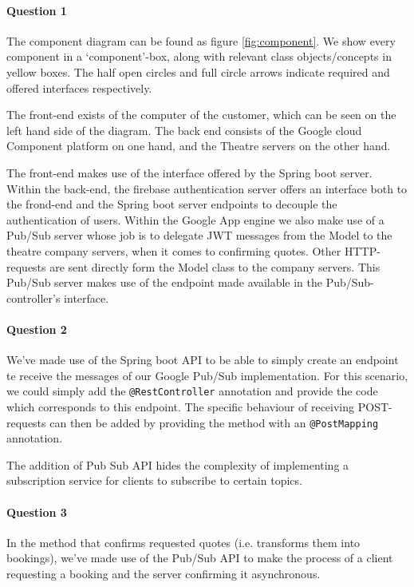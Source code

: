 \documentclass{ds-report}
\begin{document}
	\maketitle

	\paragraph{Question 1}
	The component diagram can be found as figure \ref{fig:component}. We show every component in a `component'-box, along with relevant class objects/concepts in yellow boxes. The half open circles and full circle arrows indicate required and offered interfaces respectively.
	
	The front-end exists of the computer of the customer, which can be seen on the left hand side of the diagram. The back end consists of the Google cloud Component platform on one hand, and the Theatre servers on the other hand.
	
	The front-end makes use of the interface offered by the Spring boot server. Within the back-end, the firebase authentication server offers an interface both to the frond-end and the Spring boot server endpoints to decouple the authentication of users. Within the Google App engine we also make use of a Pub/Sub server whose job is to delegate JWT messages from the Model to the theatre company servers, when it comes to confirming quotes. Other HTTP-requests are sent directly form the Model class to the company servers. This Pub/Sub server makes use of the endpoint made available in the Pub/Sub-controller's interface.
	\paragraph{Question 2} 
	We've made use of the Spring boot API to be able to simply create an endpoint te receive the messages of our Google Pub/Sub implementation. For this scenario, we could simply add the \texttt{@RestController} annotation and provide the code which corresponds to this endpoint. The specific behaviour of receiving POST-requests can then be added by providing the method with an \texttt{@PostMapping} annotation.
	
	The addition of Pub Sub API hides the complexity of implementing a subscription service for clients to subscribe to certain topics. 
	
	\paragraph{Question 3} 
	In the method that confirms requested quotes (i.e. transforms them into bookings), we've made use of the Pub/Sub API to make the process of a client requesting a booking and the server confirming it asynchronous. 
	
\end{document}
